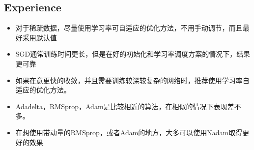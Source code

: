 \documentclass[hyperref, UTF-8]{ctexart}
\begin{document}
\subsection{Experience}
\begin{itemize}
\item 对于稀疏数据，尽量使用学习率可自适应的优化方法，不用手动调节，而且最好采用默认值
\item SGD通常训练时间更长，但是在好的初始化和学习率调度方案的情况下，结果更可靠
\item 如果在意更快的收敛，并且需要训练较深较复杂的网络时，推荐使用学习率自适应的优化方法。
\item Adadelta，RMSprop，Adam是比较相近的算法，在相似的情况下表现差不多。
\item 在想使用带动量的RMSprop，或者Adam的地方，大多可以使用Nadam取得更好的效果
\end{itemize}
\end{document}
